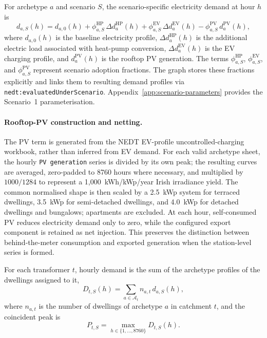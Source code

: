 \documentclass[preprint,12pt]{elsarticle}
\begin{document}
For archetype $a$ and scenario $S$, the scenario-specific electricity demand
at hour $h$ is
\begin{equation}
  d_{a,S}(h) =
    d_{a,0}(h)
    + \phi^{\mathrm{HP}}_{a,S}\,\Delta d^{\mathrm{HP}}_{a}(h)
    + \phi^{\mathrm{EV}}_{a,S}\,\Delta d^{\mathrm{EV}}_{a}(h)
    - \phi^{\mathrm{PV}}_{a,S}\,d^{\mathrm{PV}}_{a}(h),
  \label{eq:uplift}
\end{equation}
where $d_{a,0}(h)$ is the baseline electricity profile,
$\Delta d^{\mathrm{HP}}_{a}(h)$ is the additional electric load associated
with heat-pump conversion,
$\Delta d^{\mathrm{EV}}_{a}(h)$ is the EV charging profile, and
$d^{\mathrm{PV}}_{a}(h)$ is the rooftop PV generation.
The terms $\phi^{\mathrm{HP}}_{a,S}$, $\phi^{\mathrm{EV}}_{a,S}$, and
$\phi^{\mathrm{PV}}_{a,S}$ represent scenario adoption fractions.
The graph stores these fractions explicitly and links them to resulting
demand profiles via \texttt{nedt:evaluatedUnderScenario}.
Appendix~\ref{app:scenario-parameters} provides the Scenario~1
parameterisation.

\paragraph{Rooftop-PV construction and netting.}
The PV term is generated from the NEDT EV-profile uncontrolled-charging
workbook, rather than inferred from EV demand. For each valid archetype
sheet, the hourly \texttt{PV generation} series is divided by its own peak;
the resulting curves are averaged, zero-padded to 8760 hours where necessary,
and multiplied by $1000/1284$ to represent a 1,000~kWh/kWp/year Irish
irradiance yield. The common normalised shape is then scaled by a 2.5~kWp
system for terraced dwellings, 3.5~kWp for semi-detached dwellings, and
4.0~kWp for detached dwellings and bungalows; apartments are excluded.
At each hour, self-consumed PV reduces electricity demand only to zero, while
the configured export component is retained as net injection. This preserves
the distinction between behind-the-meter consumption and exported generation
when the station-level series is formed.

For each transformer $t$, hourly demand is the sum of the archetype profiles
of the dwellings assigned to it,
\begin{equation}
  D_{t,S}(h) =
    \sum_{a \in \mathcal{A}_t} n_{a,t}\, d_{a,S}(h),
  \label{eq:station_demand}
\end{equation}
where $n_{a,t}$ is the number of dwellings of archetype $a$ in catchment $t$,
and the coincident peak is
\begin{equation}
  P_{t,S} = \max_{h \in \{1,\ldots,8760\}} D_{t,S}(h).
  \label{eq:peak}
\end{equation}
\end{document}

